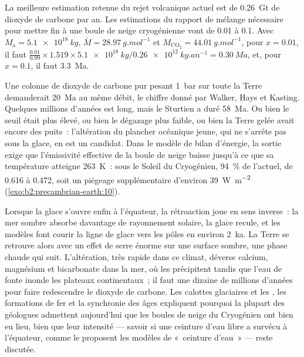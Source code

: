 \begin{example}\label{ex:b2:precambrian-earth:escape}
La meilleure estimation retenue du rejet volcanique actuel est de \qty{0.26}{Gt} de dioxyde de carbone par
an. Les estimations du rapport de
mélange nécessaire pour mettre fin à une boule de neige cryogénienne vont de 0.01 à 0.1. Avec $M_{\text{a}} =
\qty{5.1e18}{kg}$, $\bar M = \qty{28.97}{g.mol^{-1}}$ et $M_{\mathrm{CO_2}} =
\qty{44.01}{g.mol^{-1}}$, pour $x = 0.01$, il faut $\frac{0.01}{0.99}\times1.519\times\qty{5.1e18}{kg}
/ \qty{0.26e12}{kg.an^{-1}} = \qty{0.30}{Ma}$, et, pour $x = 0.1$, il faut \qty{3.3}{Ma}.
\end{example}

Une colonne de dioxyde de carbone pur pesant \qty{1}{bar} sur toute la Terre demanderait
\qty{20}{Ma} au même débit, le chiffre donné par Walker, Hays et Kasting. Quelques millions d'années
est long, mais le Sturtien a duré \qty{58}{Ma}. Ou bien le seuil était plus élevé, ou bien le
dégazage plus faible, ou bien la Terre gelée avait encore des puits~: l'altération du plancher océanique jeune,
qui ne s'arrête pas sous la glace, en est un candidat. Dans le modèle de bilan d'énergie, la sortie exige que l'émissivité effective
de la boule de neige baisse jusqu'à ce que sa température atteigne \qty{263}{K}~: sous le Soleil du Cryogénien,
\qty{94}{\percent} de l'actuel, de 0.616 à 0.472, soit un piégeage supplémentaire d'environ
\qty{39}{W.m^{-2}} (\cref{exo:b2:precambrian-earth:10}).

Lorsque la glace s'ouvre enfin à l'équateur, la rétroaction joue en sens inverse~: la mer sombre absorbe davantage
de rayonnement solaire, la glace recule, et les modèles font courir la ligne de glace vers les pôles en
environ \qty{2}{ka}. La Terre se retrouve alors avec un effet de serre énorme sur une surface sombre, une
phase chaude qui suit. L'altération, très rapide dans ce climat, déverse calcium, magnésium et bicarbonate dans
la mer, où les  précipitent tandis que l'eau de fonte inonde les plateaux continentaux~; il faut
une dizaine de millions d'années pour faire redescendre le dioxyde de carbone. Les calottes glaciaires et les , les formations de fer et la synchronie des âges expliquent pourquoi la plupart des géologues admettent
aujourd'hui que les boules de neige du Cryogénien ont bien eu lieu, bien que leur intensité --- savoir si une ceinture
d'eau libre a survécu à l'équateur, comme le proposent les modèles de «~ceinture d'eau~» --- reste discutée.

